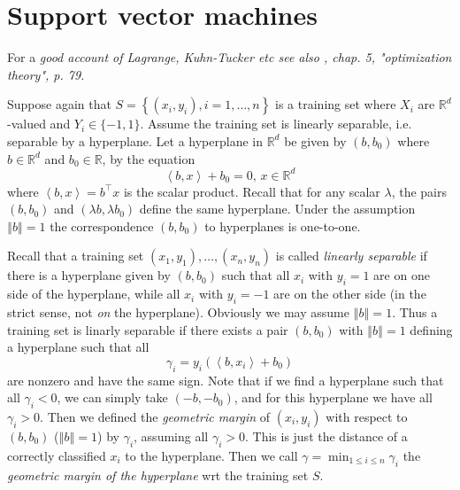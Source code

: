 \documentclass[11pt,twoside]{article}%
\theoremstyle{change}
\newenvironment{quote-env}{\begin{quote}\sffamily }{\end{quote}}
\newenvironment{mycomments-env}[1][Mycomments]{\textbf{#1.} \begin{quote-env} }{ \end{quote-env}  \ \rule{0.5em}{0.5em}}
\begin{document}
\section{Support vector machines}%

\begin{mycomments}%


\begin{mycomments-env}
For a \textit{good account of Lagrange, Kuhn-Tucker etc see also \cite{CST},
chap. 5, "optimization theory", p. 79.}
\end{mycomments-env}%

\end{mycomments}%


Suppose again that $S=\left\{  \left(  x_{i},y_{i}\right)  ,i=1,\ldots
,n\right\}  $ is a training set where $X_{i}$ are $\mathbb{R}^{d}$-valued and
$Y_{i}\in\{-1,1\}$. Assume the training set is linearly separable, i.e.
separable by a hyperplane. Let a hyperplane in $\mathbb{R}^{d}$ be given by
$\left(  b,b_{0}\right)  $ where $b\in\mathbb{R}^{d}$ and $b_{0}\in\mathbb{R}%
$, by the equation
\begin{equation}
\left\langle b,x\right\rangle +b_{0}=0\text{, }x\in\mathbb{R}^{d}%
\end{equation}
where $\left\langle b,x\right\rangle =b^{\top}x$ is the scalar product. Recall
that for any scalar $\lambda$, the pairs $\left(  b,b_{0}\right)  $ and
$\left(  \lambda b,\lambda b_{0}\right)  $ define the same hyperplane. Under
the assumption $\left\Vert b\right\Vert =1$ the correspondence $\left(
b,b_{0}\right)  $ to hyperplanes is one-to-one.

Recall that a training set $\left(  x_{1},y_{1}\right)  ,\ldots,(x_{n},y_{n})$
is called \textit{linearly separable} if there is a hyperplane given by
$\left(  b,b_{0}\right)  $ such that all $x_{i}$ with $y_{i}=1$ are on one
side of the hyperplane, while all $x_{i}$ with $y_{i}=-1$ are on the other
side (in the strict sense, not \textit{on} the hyperplane). Obviously we may
assume $\left\Vert b\right\Vert =1.$ Thus a training set is linarly separable
if there exists a pair $\left(  b,b_{0}\right)  $ with $\left\Vert
b\right\Vert =1$ defining a hyperplane such that all
\[
\gamma_{i}=y_{i}\left(  \left\langle b,x_{i}\right\rangle +b_{0}\right)
\]
are nonzero and have the same sign. Note that if we find a hyperplane such
that all $\gamma_{i}<0$, we can simply take $\left(  -b,-b_{0}\right)  $, and
for this hyperplane we have all $\gamma_{i}>0$. Then we defined the
\textit{geometric margin} of $\left(  x_{i},y_{i}\right)  $ with respect to
$\left(  b,b_{0}\right)  $ ($\left\Vert b\right\Vert =1$) by $\gamma_{i}$,
assuming all $\gamma_{i}>0$. This is just the distance of a correctly
classified $x_{i}$ to the hyperplane. Then we call $\gamma=\min_{1\leq i\leq
n}\gamma_{i}$ the \textit{geometric margin of the hyperplane} wrt the training
set $S $. \bigskip\bigskip
\end{document}
